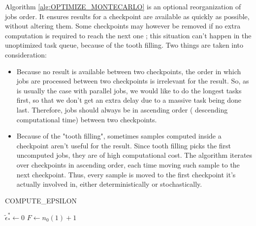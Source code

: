 \documentclass[./thesis.tex]{subfiles}
\begin{document}
Algorithm \ref{alg:OPTIMIZE_MONTECARLO} is an optional reorganization of jobs order. It ensures results for a checkpoint are available as quickly as possible, without altering them. Some checkpoints may however be removed if no extra computation is required to reach the next one ; this situation can't happen in the unoptimized task queue, because of the tooth filling. Two things are taken into consideration:
\begin{itemize}
\item
Because no result is available between two checkpoints, the order in which jobs are processed between two checkpoints is irrelevant for the result. So, as is usually the case with parallel jobs, we would like to do the longest tasks first, so that we don't get an extra delay due to a massive task being done last. Therefore, jobs should always be in ascending order ( descending computational time) between two checkpoints.
\item
Because of the "tooth filling", sometimes samples computed inside a checkpoint aren't useful for the result. Since tooth filling picks the first uncomputed jobs, they are of high computational cost. The algorithm iterates over checkpoints in ascending order, each time moving such sample to the next checkpoint. Thus, every sample is moved to the first checkpoint it's actually involved in, either deterministically or stochastically.
\end{itemize}



\begin{algorithm}
	\label{COMPUTE_EPSILON}
	\caption{COMPUTE\_EPSILON}
		\KwResult{ $\tilde \epsilon$}
		$\tilde \epsilon^*_* \gets 0$ \;
		$F \gets n_0(1)+1$ \;		
\end{algorithm}
\end{document}
